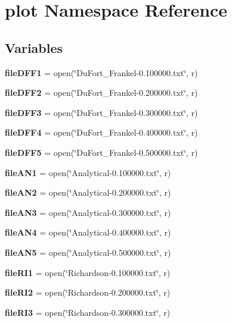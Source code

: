 \section{plot Namespace Reference}
\label{namespaceplot}
\subsection*{Variables}
\begin{DoxyCompactItemize}
\item 
\textbf{ file\+D\+F\+F1} = open(\char`\"{}Du\+Fort\+\_\+\+Frankel-\/0.\+100000.txt\char`\"{}, \textquotesingle{}r\textquotesingle{})
\item 
\textbf{ file\+D\+F\+F2} = open(\char`\"{}Du\+Fort\+\_\+\+Frankel-\/0.\+200000.txt\char`\"{}, \textquotesingle{}r\textquotesingle{})
\item 
\textbf{ file\+D\+F\+F3} = open(\char`\"{}Du\+Fort\+\_\+\+Frankel-\/0.\+300000.txt\char`\"{}, \textquotesingle{}r\textquotesingle{})
\item 
\textbf{ file\+D\+F\+F4} = open(\char`\"{}Du\+Fort\+\_\+\+Frankel-\/0.\+400000.txt\char`\"{}, \textquotesingle{}r\textquotesingle{})
\item 
\textbf{ file\+D\+F\+F5} = open(\char`\"{}Du\+Fort\+\_\+\+Frankel-\/0.\+500000.txt\char`\"{}, \textquotesingle{}r\textquotesingle{})
\item 
\textbf{ file\+A\+N1} = open(\char`\"{}Analytical-\/0.\+100000.txt\char`\"{}, \textquotesingle{}r\textquotesingle{})
\item 
\textbf{ file\+A\+N2} = open(\char`\"{}Analytical-\/0.\+200000.txt\char`\"{}, \textquotesingle{}r\textquotesingle{})
\item 
\textbf{ file\+A\+N3} = open(\char`\"{}Analytical-\/0.\+300000.txt\char`\"{}, \textquotesingle{}r\textquotesingle{})
\item 
\textbf{ file\+A\+N4} = open(\char`\"{}Analytical-\/0.\+400000.txt\char`\"{}, \textquotesingle{}r\textquotesingle{})
\item 
\textbf{ file\+A\+N5} = open(\char`\"{}Analytical-\/0.\+500000.txt\char`\"{}, \textquotesingle{}r\textquotesingle{})
\item 
\textbf{ file\+R\+I1} = open(\char`\"{}Richardson-\/0.\+100000.txt\char`\"{}, \textquotesingle{}r\textquotesingle{})
\item 
\textbf{ file\+R\+I2} = open(\char`\"{}Richardson-\/0.\+200000.txt\char`\"{}, \textquotesingle{}r\textquotesingle{})
\item 
\textbf{ file\+R\+I3} = open(\char`\"{}Richardson-\/0.\+300000.txt\char`\"{}, \textquotesingle{}r\textquotesingle{})

\end{DoxyCompactItemize}
